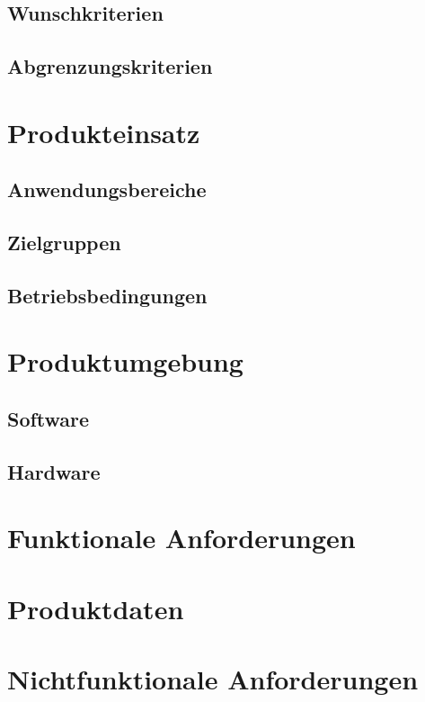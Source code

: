 \documentclass[a4paper]{scrreprt}
\begin{document}
        \section{Wunschkriterien}

        \section{Abgrenzungskriterien}

    \chapter{Produkteinsatz}

        \section{Anwendungsbereiche}

        \section{Zielgruppen}

        \section{Betriebsbedingungen}

    \chapter{Produktumgebung}
        \section{Software}

        \section{Hardware}

    \chapter{Funktionale Anforderungen}

    \chapter{Produktdaten}

    \chapter{Nichtfunktionale Anforderungen}	
\end{document}
